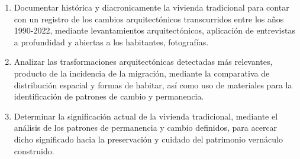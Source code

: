 





\begin{enumerate}

  \item{Documentar histórica y diacronicamente la vivienda tradicional para contar con un registro de los cambios arquitectónicos transcurridos entre los años 1990-2022, mediante levantamientos arquitectónicos, aplicación de entrevistas a profundidad y abiertas a los habitantes, fotografías.} 

  \item{Analizar las trasformaciones arquitectónicas detectadas más relevantes, producto de la incidencia de la migración, mediante la comparativa de distribución espacial y formas de habitar, así como uso de materiales para la identificación de patrones de cambio y permanencia.}

  \item{Determinar la significación actual de la vivienda tradicional, mediante el análisis de los patrones de permanencia y cambio definidos, para acercar dicho significado hacia la preservación y cuidado del patrimonio vernáculo construido.} 

\end{enumerate}

